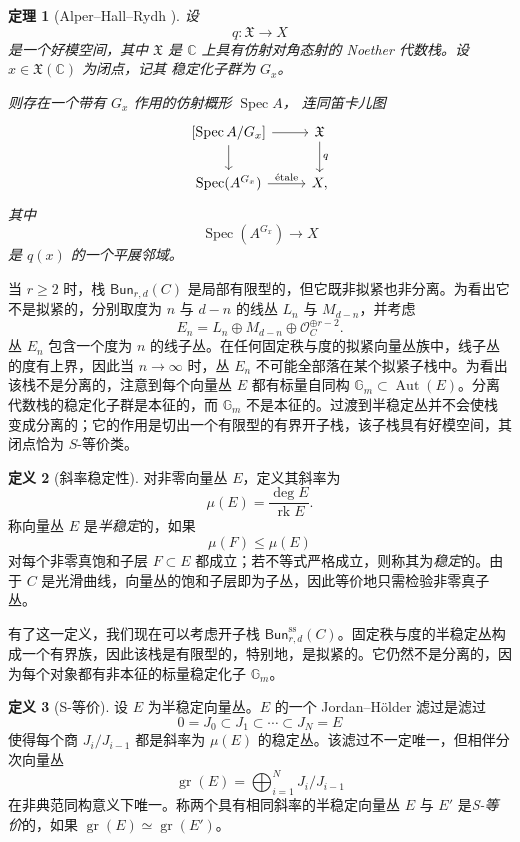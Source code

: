 \documentclass{amsart}
\newtheorem{thm}{定理}[section]
\theoremstyle{definition}
\newtheorem{defn}[thm]{定义}
\theoremstyle{remark}
\theoremstyle{plain}
\theoremstyle{definition}
\theoremstyle{remark}
\newcommand{\G}{\mathbb{G}}
\newcommand{\C}{\mathbb{C}}
\newcommand{\mc}[1]{\mathcal{#1}}
\newcommand{\mf}[1]{\mathfrak{#1}}
\newcommand{\mr}[1]{\mathrm{#1}}
\newcommand{\on}[1]{\operatorname{#1}}
\newcommand{\ms}[1]{\mathsf{#1}}
\newcommand{\1}{\mathbf{1}}
\newcommand{\2}{\mathbf{2}}
\newcommand{\3}{\mathbf{3}}
\begin{document}
\begin{thm}[Alper--Hall--Rydh {\cite{AHR2020}}]
    设
    \[
        q\colon \mf{X}\longrightarrow X
    \]
    是一个好模空间，其中 \(\mf{X}\) 是 \(\C\) 上具有仿射对角态射的
    Noether 代数栈。设 \(x\in\mf{X}(\C)\) 为闭点，记其
    稳定化子群为 \(G_x\)。

    则存在一个带有 \(G_x\) 作用的仿射概形 \(\on{Spec}A\)，
    连同笛卡儿图
    \[
        \begin{tikzcd}
            {[\on{Spec}A/G_x]}
                \arrow[r]
                \arrow[d]
            & \mf{X}
                \arrow[d, "q"]
            \\
            \on{Spec}(A^{G_x})
                \arrow[r, "\mathrm{\acute{e}tale}"]
            & X,
        \end{tikzcd}
    \]
    其中
    \[
        \on{Spec}(A^{G_x})\longrightarrow X
    \]
    是 \(q(x)\) 的一个平展邻域。
\end{thm}

当 \(r\geq 2\) 时，栈 \(\ms{Bun}_{r,d}(C)\) 是局部有限型的，但它既非拟紧也非分离。为看出它不是拟紧的，分别取度为 \(n\) 与 \(d-n\) 的线丛 \(L_n\) 与 \(M_{d-n}\)，并考虑
\[
    E_n=L_n\oplus M_{d-n}\oplus\mc{O}_C^{\oplus r-2}.
\]
丛 \(E_n\) 包含一个度为 \(n\) 的线子丛。在任何固定秩与度的拟紧向量丛族中，线子丛的度有上界，因此当 \(n\to\infty\) 时，丛 \(E_n\) 不可能全部落在某个拟紧子栈中。为看出该栈不是分离的，注意到每个向量丛 \(E\) 都有标量自同构 \(\G_m\subset\on{Aut}(E)\)。分离代数栈的稳定化子群是本征的，而 \(\G_m\) 不是本征的。过渡到半稳定丛并不会使栈变成分离的；它的作用是切出一个有限型的有界开子栈，该子栈具有好模空间，其闭点恰为 \(S\)-等价类。

\begin{defn}[斜率稳定性]
    对非零向量丛 \(E\)，定义其斜率为
    \[ \mu(E)=\frac{\deg E}{\on{rk}E}. \]
    称向量丛 \(E\) 是\textit{半稳定}的，如果
    \[ \mu(F)\leq\mu(E) \]
    对每个非零真饱和子层 \(F\subset E\) 都成立；若不等式严格成立，则称其为\textit{稳定}的。由于 \(C\) 是光滑曲线，向量丛的饱和子层即为子丛，因此等价地只需检验非零真子丛。
\end{defn}

有了这一定义，我们现在可以考虑开子栈 \(\ms{Bun}_{r,d}^{\mr{ss}}(C)\)。固定秩与度的半稳定丛构成一个有界族，因此该栈是有限型的，特别地，是拟紧的。它仍然不是分离的，因为每个对象都有非本征的标量稳定化子 \(\G_m\)。

\begin{defn}[S-等价]
    设 \(E\) 为半稳定向量丛。\(E\) 的一个 Jordan--H\"older 滤过是滤过
    \[ 0=J_0\subset J_1\subset\cdots\subset J_N=E \]
    使得每个商 \(J_i/J_{i-1}\) 都是斜率为 \(\mu(E)\) 的稳定丛。该滤过不一定唯一，但相伴分次向量丛
    \[
        \on{gr}(E)=\bigoplus_{i=1}^N J_i/J_{i-1}
    \]
    在非典范同构意义下唯一。称两个具有相同斜率的半稳定向量丛 \(E\) 与 \(E'\) 是\textit{S-等价}的，如果 \(\on{gr}(E)\simeq\on{gr}(E')\)。
\end{defn}
\end{document}
